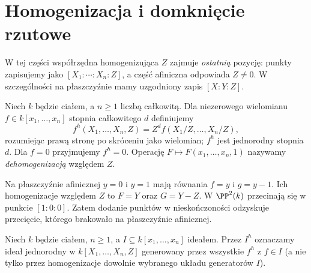 \section{Homogenizacja i domknięcie rzutowe}

W tej części współrzędna homogenizująca $Z$ zajmuje
\emph{ostatnią} pozycję: punkty zapisujemy jako
$[X_1:\cdots:X_n:Z]$, a część afiniczna odpowiada $Z\ne0$.
W szczególności na płaszczyźnie mamy uzgodniony zapis $[X:Y:Z]$.

\begin{definicja}[Homogenizacja]
Niech $k$ będzie ciałem, a $n\ge1$ liczbą całkowitą.
Dla niezerowego wielomianu $f\in k[x_1,\ldots,x_n]$
stopnia całkowitego $d$ definiujemy
\[
 f^h(X_1,\ldots,X_n,Z)
 =Z^d f(X_1/Z,\ldots,X_n/Z),
\]
rozumiejąc prawą stronę po skróceniu jako wielomian;
$f^h$ jest jednorodny stopnia $d$. Dla $f=0$ przyjmujemy
$f^h=0$. Operację $F\mapsto F(x_1,\ldots,x_n,1)$
nazywamy \emph{dehomogenizacją} względem $Z$.
\end{definicja}

\begin{przyklad}
Na płaszczyźnie afinicznej $y=0$ i $y=1$ mają równania
$f=y$ i $g=y-1$. Ich homogenizacje względem $Z$ to
$F=Y$ oraz $G=Y-Z$.
W $\PP^2(k)$ przecinają się w punkcie $[1:0:0]$.
Zatem dodanie punktów w nieskończoności odzyskuje
przecięcie, którego brakowało na płaszczyźnie afinicznej.
\end{przyklad}

\begin{definicja}
Niech $k$ będzie ciałem, $n\ge1$, a
$I\subseteq k[x_1,\ldots,x_n]$ ideałem.
Przez $I^h$ oznaczamy ideał jednorodny w
$k[X_1,\ldots,X_n,Z]$ generowany przez wszystkie $f^h$
z $f\in I$ (a nie tylko przez homogenizacje dowolnie
wybranego układu generatorów $I$).
\end{definicja}

